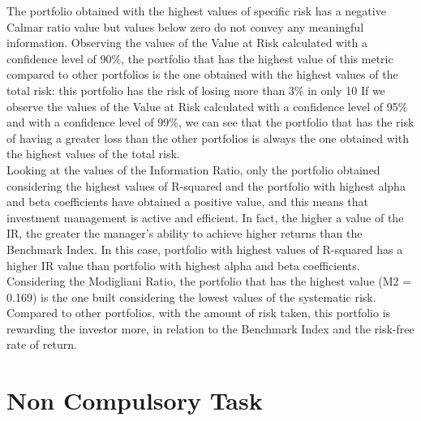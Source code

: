 \documentclass[twocolumn]{article}
\begin{document}
The portfolio obtained with the highest values of specific risk has a negative Calmar ratio value but values below zero do not convey any meaningful information.
Observing the values of the Value at Risk calculated with a confidence level of 90\%, the portfolio that has the highest value of this metric compared to other portfolios is the one obtained with the highest values of the total risk: this portfolio has the risk of losing more than 3\% in only 10%
If we observe the values of the Value at Risk calculated with a confidence level of 95\% and with a confidence level of 99\%, we can see that the portfolio that has the risk of having a greater loss than the other portfolios is always the one obtained with the highest values of the total risk.\\
Looking at the values of the Information Ratio, only the portfolio obtained considering the highest values of R-squared and the portfolio with highest alpha and beta coefficients have obtained a positive value, and this means that investment management is active and efficient. In fact, the higher a value of the IR, the greater the manager's ability to achieve higher returns than the Benchmark Index. In this case, portfolio with highest values of R-squared has a higher IR value than portfolio with highest alpha and beta coefficients.\\
Considering the Modigliani Ratio, the portfolio that has the highest value (M2 = 0.169) is the one built considering the lowest values of the systematic risk. Compared to other portfolios, with the amount of risk taken, this portfolio is rewarding the investor more, in relation to the Benchmark Index and the risk-free rate of return.
\section{Non Compulsory Task}
\end{document}
